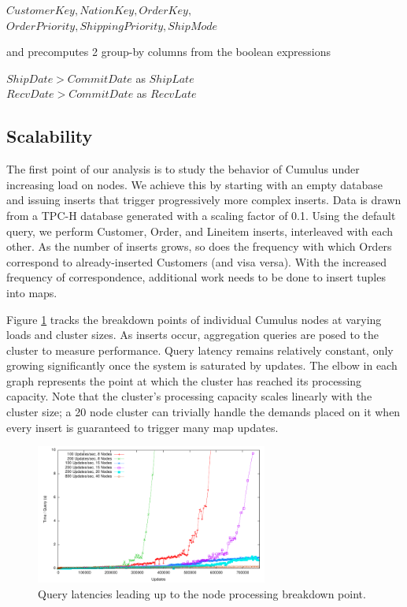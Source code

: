{\noindent $CustomerKey, NationKey, OrderKey,$ \\
$OrderPriority, ShippingPriority, ShipMode$}

\noindent and precomputes 2 group-by columns from the boolean expressions

{\noindent $ShipDate > CommitDate$ as $ShipLate$\\
$RecvDate > CommitDate$ as $RecvLate$}

\subsection{Scalability}

The first point of our analysis is to study the behavior of Cumulus under increasing load on nodes.  We achieve this by starting with an empty database and issuing inserts that trigger progressively more complex inserts.  Data is drawn from a TPC-H database generated with a scaling factor of 0.1.  Using the default query, we perform Customer, Order, and Lineitem inserts, interleaved with each other.  As the number of inserts grows, so does the frequency with which Orders correspond to already-inserted Customers (and visa versa).  With the increased frequency of correspondence, additional work needs to be done to insert tuples into maps.  

Figure \ref{fig:expandingbreakdown} tracks the breakdown points of individual Cumulus nodes at varying loads and cluster sizes.  As inserts occur, aggregation queries are posed to the cluster to measure performance.  Query latency remains relatively constant, only growing significantly once the system is saturated by updates.  The elbow in each graph represents the point at which the cluster has reached its processing capacity.  Note that the cluster's processing capacity scales linearly with the cluster size; a 20 node cluster can trivially handle the demands placed on it when every insert is guaranteed to trigger many map updates.

\begin{figure}
\begin{center}
\includegraphics[width=3.0in]{images/expandingbreakdown.pdf}
\caption{Query latencies leading up to the node processing breakdown point.}
\label{fig:expandingbreakdown}
\end{center}
\end{figure}

